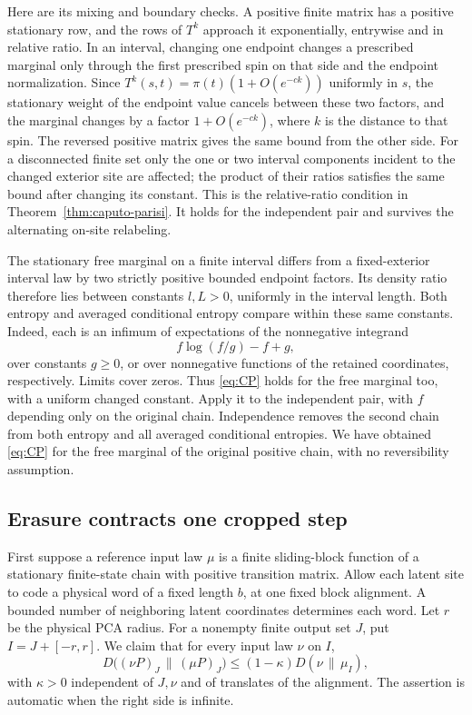 Here are its mixing and boundary checks. A positive finite matrix has a positive stationary row, and the rows of \(T^k\) approach it exponentially, entrywise and in relative ratio. In an interval, changing one endpoint changes a prescribed marginal only through the first prescribed spin on that side and the endpoint normalization. Since \(T^k(s,t)=\pi(t)(1+O(e^{-ck}))\) uniformly in \(s\), the stationary weight of the endpoint value cancels between these two factors, and the marginal changes by a factor \(1+O(e^{-ck})\), where \(k\) is the distance to that spin. The reversed positive matrix gives the same bound from the other side. For a disconnected finite set only the one or two interval components incident to the changed exterior site are affected; the product of their ratios satisfies the same bound after changing its constant. This is the relative-ratio condition in Theorem~\ref{thm:caputo-parisi}. It holds for the independent pair and survives the alternating on-site relabeling.

The stationary free marginal on a finite interval differs from a fixed-exterior interval law by two strictly positive bounded endpoint factors. Its density ratio therefore lies between constants \(l,L>0\), uniformly in the interval length. Both entropy and averaged conditional entropy compare within these same constants. Indeed, each is an infimum of expectations of the nonnegative integrand
\[
 f\log(f/g)-f+g,
\]
over constants \(g\ge0\), or over nonnegative functions of the retained coordinates, respectively. Limits cover zeros. Thus \eqref{eq:CP} holds for the free marginal too, with a uniform changed constant. Apply it to the independent pair, with \(f\) depending only on the original chain. Independence removes the second chain from both entropy and all averaged conditional entropies. We have obtained \eqref{eq:CP} for the free marginal of the original positive chain, with no reversibility assumption.

\subsection{Erasure contracts one cropped step}\label{sec:cropped-entropy}

First suppose a reference input law \(\mu\) is a finite sliding-block function of a stationary finite-state chain with positive transition matrix. Allow each latent site to code a physical word of a fixed length \(b\), at one fixed block alignment. A bounded number of neighboring latent coordinates determines each word. Let \(r\) be the physical PCA radius. For a nonempty finite output set \(J\), put \(I=J+[-r,r]\). We claim that for every input law \(\nu\) on \(I\),
\begin{equation}\label{eq:cropped-KL}
 D\bigl((\nu P)_J\,\|\,(\mu P)_J\bigr)
 \le(1-\kappa)D(\nu\,\|\,\mu_I),
\end{equation}
with \(\kappa>0\) independent of \(J,\nu\) and of translates of the alignment. The assertion is automatic when the right side is infinite.

